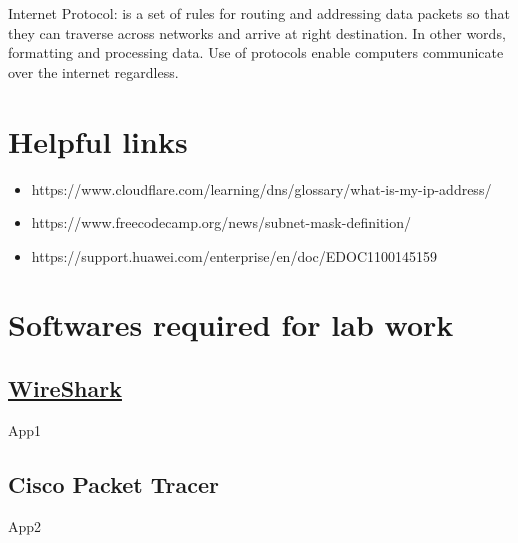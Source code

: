 \documentclass{article}
\begin{document}
Internet Protocol: is a set of rules for routing and addressing data packets so that they can traverse across networks and arrive at right destination.
In other words, formatting and processing data.
Use of protocols enable computers communicate over the internet regardless.


\section*{Helpful links}
\begin{itemize}
    \item https://www.cloudflare.com/learning/dns/glossary/what-is-my-ip-address/
    \item https://www.freecodecamp.org/news/subnet-mask-definition/
    \item https://support.huawei.com/enterprise/en/doc/EDOC1100145159
\end{itemize}


\section*{Softwares required for lab work}

\subsection*{\href{https://www.wireshark.org/}{WireShark}}
App1

\subsection*{Cisco Packet Tracer}
App2
\end{document}
